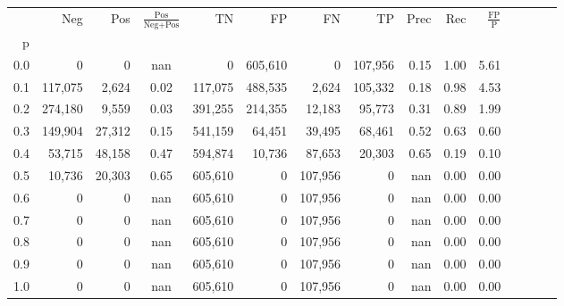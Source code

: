 \begin{tabular}{rrrcrrrrrrrrrrr}
\toprule
{} &      Neg &     Pos & $\frac{\text{Pos}}{\text{Neg}+\text{Pos}}$ &       TN &       FP &       FN &       TP &  Prec &   Rec & $\frac{\text{FP}}{\text{P}}$ \\
p   &          &         &                                            &          &          &          &          &       &       &                              \\
\midrule
0.0 &        0 &       0 &                                        nan &        0 &  605,610 &        0 &  107,956 &  0.15 &  1.00 &                         5.61 \\
0.1 &  117,075 &   2,624 &                                       0.02 &  117,075 &  488,535 &    2,624 &  105,332 &  0.18 &  0.98 &                         4.53 \\
0.2 &  274,180 &   9,559 &                                       0.03 &  391,255 &  214,355 &   12,183 &   95,773 &  0.31 &  0.89 &                         1.99 \\
0.3 &  149,904 &  27,312 &                                       0.15 &  541,159 &   64,451 &   39,495 &   68,461 &  0.52 &  0.63 &                         0.60 \\
0.4 &   53,715 &  48,158 &                                       0.47 &  594,874 &   10,736 &   87,653 &   20,303 &  0.65 &  0.19 &                         0.10 \\
0.5 &   10,736 &  20,303 &                                       0.65 &  605,610 &        0 &  107,956 &        0 &   nan &  0.00 &                         0.00 \\
0.6 &        0 &       0 &                                        nan &  605,610 &        0 &  107,956 &        0 &   nan &  0.00 &                         0.00 \\
0.7 &        0 &       0 &                                        nan &  605,610 &        0 &  107,956 &        0 &   nan &  0.00 &                         0.00 \\
0.8 &        0 &       0 &                                        nan &  605,610 &        0 &  107,956 &        0 &   nan &  0.00 &                         0.00 \\
0.9 &        0 &       0 &                                        nan &  605,610 &        0 &  107,956 &        0 &   nan &  0.00 &                         0.00 \\
1.0 &        0 &       0 &                                        nan &  605,610 &        0 &  107,956 &        0 &   nan &  0.00 &                         0.00 \\
\bottomrule
\end{tabular}
